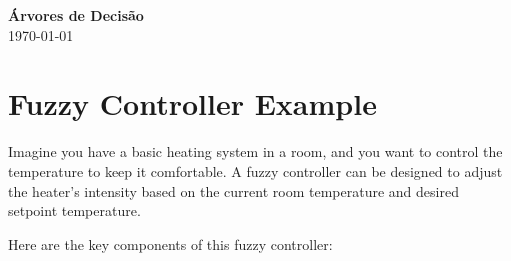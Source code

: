 \documentclass[12pt,a4paper, brazil]{article}
\begin{document}
\begin{center}
{\textbf {\huge Árvores de Decisão}}\\[5mm]
\today\\[5mm] %
\end{center}



\section{Fuzzy Controller Example}


Imagine you have a basic heating system in a room, and you want to control the temperature to keep it comfortable. A fuzzy controller can be designed to adjust the heater's intensity based on the current room temperature and desired setpoint temperature.

Here are the key components of this fuzzy controller:
\end{document}
